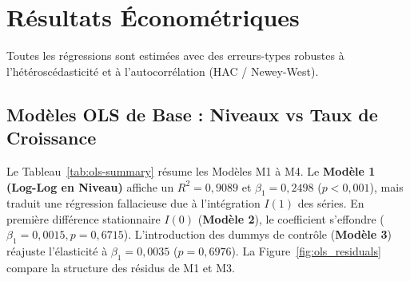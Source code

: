 \section{Résultats Économétriques}\label{sec:results}

Toutes les régressions sont estimées avec des erreurs-types robustes à l'hétéroscédasticité et à l'autocorrélation (HAC / Newey-West).

\subsection{Modèles OLS de Base : Niveaux vs Taux de Croissance}
Le Tableau~\ref{tab:ols-summary} résume les Modèles M1 à M4. Le \textbf{Modèle 1 (Log-Log en Niveau)} affiche un $R^2 = 0{,}9089$ et $\beta_1 = 0{,}2498$ ($p < 0{,}001$), mais traduit une régression fallacieuse due à l'intégration $I(1)$ des séries. En première différence stationnaire $I(0)$ (\textbf{Modèle 2}), le coefficient s'effondre ($\beta_1 = 0{,}0015, p = 0{,}6715$). L'introduction des dummys de contrôle (\textbf{Modèle 3}) réajuste l'élasticité à $\beta_1 = 0{,}0035$ ($p = 0{,}6976$). La Figure~\ref{fig:ols_residuals} compare la structure des résidus de M1 et M3.

\begin{table}[htbp]
  \centering
  \caption{Résultats des régressions OLS de base (Erreurs-types HAC / Newey-West)}
  \label{tab:ols-summary}
  \small
\end{table}

